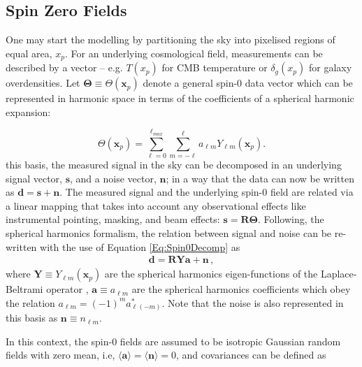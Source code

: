 \subsection{Spin Zero Fields}\label{Sec:BPL:Spin-0_Form}
One may start the modelling by partitioning the sky into pixelised regions of equal area, $x_p$. For an underlying cosmological field, measurements can be described by a vector -- e.g. $T(x_p)$ for CMB temperature or $\delta_g (x_p)$ for galaxy overdensities. Let $\mathbf{\Theta} \equiv \Theta(\mathbf{x}_p)$ denote a general spin-0 data vector which can be represented in harmonic space in terms of the coefficients of a spherical harmonic expansion:

\begin{equation}
\Theta (\mathbf{x}_p) = \sum_{\ell=0}^{\ell_{max}}\sum_{m=-\ell}^{\ell}a_{\ell m}Y_{\ell m}(\mathbf{x}_p).
\label{Eq:Spin0Decomp}
\end{equation}
\noindent this basis, the measured signal in the sky can be decomposed in an underlying signal vector, $\mathbf{s}$, and a noise vector, $\mathbf{n}$; in a way that the data can now be written as $\mathbf{d=s+n}$. The measured signal and the underlying spin-0 field are related via a linear mapping that takes into account any observational effects like instrumental pointing, masking, and beam effects: $\mathbf{s = R\Theta}$. Following, the spherical harmonics formalism, the relation between signal and noise can be re-written with the use of Equation \eqref{Eq:Spin0Decomp} as
\begin{align}
\mathbf{d=RYa+n}\, ,
\label{Eq:DataDecomposed}
\end{align}
\noindent  where $\mathbf{Y} \equiv Y_{\ell m}(\textbf{x}_p)$ are the spherical harmonics eigen-functions of the Laplace-Beltrami operator \citep{2008DahlenSimons}, $\mathbf{a} \equiv a_{\ell m}$ are the spherical harmonics coefficients which obey the relation $a_{\ell m} = (-1)^{m}a^*_{\ell (-m)}$. Note that the noise is also represented in this basis as $\textbf{n} \equiv n_{\ell m}$. 

\qquad In this context, the spin-0 fields are assumed to be isotropic Gaussian random fields with zero mean, i.e, $\langle \textbf{a} \rangle = \langle \textbf{n} \rangle = 0$, and covariances can be defined as

